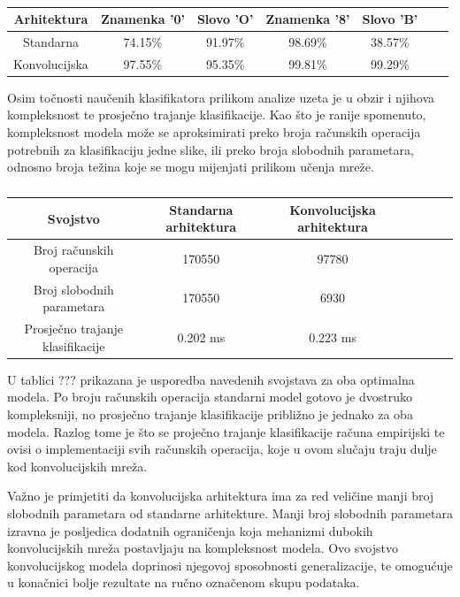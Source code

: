 \documentclass[lmodern, utf8, diplomski, numeric]{fer}
\begin{document}
\begin{table}[ht!]
\begin{center}
\centering
    \begin{tabular}{ | c| c| c|c | c| c| c|}
    \hline    		
    Arhitektura & Znamenka '0' & Slovo 'O' & Znamenka '8' & Slovo 'B'  \\ \hline
    Standarna & 74.15\% & 91.97\% & 98.69\% & 38.57\%  \\ \hline
    Konvolucijska & 97.55\% & 95.35\% & 99.81\% & 99.29\%   \\
    \hline
    \end{tabular}
\end{center}
\caption{}
\end{table}

Osim točnosti naučenih klasifikatora prilikom analize uzeta je u obzir i njihova kompleksnost te prosječno trajanje klasifikacije. Kao što je ranije spomenuto, kompleksnost modela može se aproksimirati preko broja računskih operacija potrebnih za klasifikaciju jedne slike, ili preko broja slobodnih parametara, odnosno broja težina koje se mogu mijenjati prilikom učenja mreže.  

\begin{table}[ht!]
\begin{center}
\centering
    \begin{tabular}{ | c| c| c|c | c| c| c|}
    \hline    		
    Svojstvo & Standarna arhitektura & Konvolucijska arhitektura \\ \hline
    Broj računskih operacija & 170550 & 97780  \\ \hline
    Broj slobodnih parametara & 170550 & 6930   \\ \hline
    Prosječno trajanje klasifikacije  & 0.202 ms & 0.223 ms \\
    \hline
    \end{tabular}
\end{center}
\caption{}
\end{table}

U tablici ??? prikazana je usporedba navedenih svojstava za oba optimalna modela. Po broju računskih operacija standarni model gotovo je dvostruko kompleksniji, no prosječno trajanje klasifikacije približno je jednako za oba modela. Razlog tome je što se proječno trajanje klasifikacije računa empirijski te ovisi o implementaciji svih računskih operacija, koje u ovom slučaju traju dulje kod konvolucijskih mreža. 

Važno je primjetiti da konvolucijska arhitektura ima za red veličine manji broj slobodnih parametara od standarne arhitekture. Manji broj slobodnih parametara izravna je posljedica dodatnih ograničenja koja mehanizmi dubokih konvolucijskih mreža postavljaju na kompleksnost modela. Ovo svojstvo konvolucijskog modela doprinosi njegovoj sposobnosti generalizacije, te omogućuje u konačnici bolje rezultate na ručno označenom skupu podataka.
\end{document}
